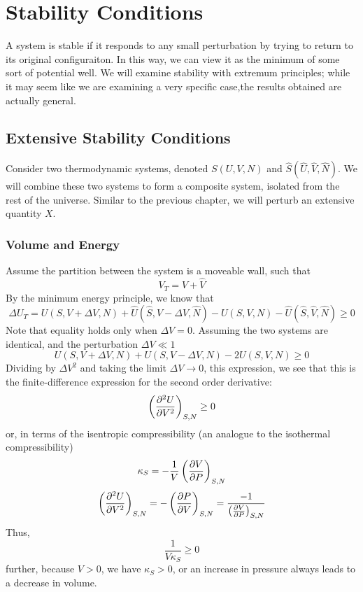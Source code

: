 \chapter{Stability Conditions}
A system is stable if it responds to any small perturbation by trying to return to its original configuraiton. In this way, we can view it as the minimum of some sort of potential well. We will examine stability with extremum principles; while it may seem like we are examining a very specific case,the results obtained are actually general.

\section{Extensive Stability Conditions}
Consider two thermodynamic systems, denoted \(S(U,V,N)\) and \(\hat S (\hat U, \hat V, \hat N)\). We will combine these two systems to form a composite system, isolated from the rest of the universe. Similar to the previous chapter, we will perturb an extensive quantity \(X\).

\subsection{Volume and Energy}
Assume the partition between the system is a moveable wall, such that
\[V_T=V+\hat V\]
By the minimum energy principle, we know that
\[\Delta U_{T}=U(S,V+\Delta V, N)+\hat U(\hat S, \hat V-\Delta V, \hat N)-U(S,V,N)-\hat U(\hat S,\hat V,\hat N)\geq0\]
Note that equality holds only when \(\Delta V=0\). Assuming the two systems are identical, and the perturbation \(\Delta V\ll1\)
\[U(S,V+\Delta V,N)+U(S,V-\Delta V,N)-2U(S,V,N)\geq0\]
Dividing by \(\Delta V^2\) and taking the limit \(\Delta V\to0\), this expression, we see that this is the finite-difference expression for the second order derivative:
\begin{equation}
	\left(\frac{\partial ^2U}{\partial V^2}\right)_{S,N}\geq0
\end{equation}
or, in terms of the isentropic compressibility (an analogue to the isothermal compressibility)
\[\kappa_S = -\frac{1}{V}\left(\frac{\partial V}{\partial P}\right)_{S,N}\]
\[\left(\frac{\partial ^2U}{\partial V^2}\right)_{S,N}=-\left(\frac{\partial P}{\partial V}\right)_{S,N}=\frac{-1}{\left(\frac{\partial V}{\partial P}\right)_{S,N}}\]
Thus,
\begin{equation}
	\frac{1}{V\kappa_S}\geq0
\end{equation}
further, because \(V>0\), we have \(\kappa_S>0\), or an increase in pressure always leads to a decrease in volume.

